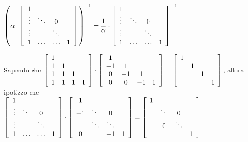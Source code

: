 \documentclass[10pt]{book}
\begin{document}
\begin{list}{}{}
	\item $\left(\alpha\cdot\left[\begin{array}{c c c c}
1 &  & & \\
\vdots & \ddots & 0 \\
\vdots & & \ddots & \\
1 & \ldots & \ldots & 1
\end{array} \right]\right)^{-1} = \mathlarger{\frac{1}{\alpha}}\cdot\left[\begin{array}{c c c c}
1 &  & & \\
\vdots & \ddots & 0 \\
\vdots & & \ddots & \\
1 & \ldots & \ldots & 1
\end{array} \right]^{-1}$
	\item Sapendo che $\left[\begin{array}{c c c c}
		1\\
		1&1\\
		1&1&1\\
		1&1&1&1
	\end{array}\right]\cdot\left[\begin{array}{c c c c}
		1\\
		-1&1\\
		0&-1&1\\
		0&0&-1&1
	\end{array}\right] = \left[\begin{array}{c c c c}
		1\\
		&1\\
		& &1\\
		& & &1
	\end{array}\right]$, allora ipotizzo che\\
	$\left[\begin{array}{c c c c}
1 &  & & \\
\vdots & \ddots & 0\\
\vdots & & \ddots & \\
1 & \ldots & \ldots & 1
\end{array} \right]\cdot\left[\begin{array}{c c c c}
1 &  & & \\
-1 & \ddots &0 \\
 & \ddots & \ddots & \\
 0&  & -1 & 1
\end{array} \right] = \left[\begin{array}{c c c c}
		1\\
		&\ddots & 0\\
		&0&\ddots\\
		& & &1
	\end{array}\right]$
\end{list}
\end{document}
